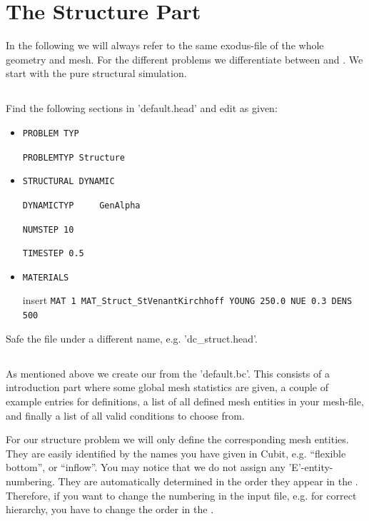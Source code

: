 \section{The Structure Part}

In the following we will always refer to the same exodus-file of the whole
geometry and mesh. For the different problems we differentiate between \head and
\bc. We start with the pure structural simulation.

\subsection{\head}
Find the following sections in 'default.head' and edit as given:

\begin{itemize}
 \item \verb|PROBLEM TYP|

 \verb|PROBLEMTYP Structure|
 \item \verb|STRUCTURAL DYNAMIC|

 \verb|DYNAMICTYP     GenAlpha|

 \verb|NUMSTEP 10|

 \verb|TIMESTEP 0.5|

 \item \verb|MATERIALS|

  insert \verb|MAT 1 MAT_Struct_StVenantKirchhoff YOUNG 250.0 NUE 0.3 DENS 500|
 
\end{itemize}
Safe the file under a different name, e.g. 'dc\_struct.head'.


\subsection{\bc}
As mentioned above we create our \bc from the 'default.bc'. This consists of a
introduction part where some global mesh statistics are given, a couple of
example entries for definitions, a list of all defined mesh entities in
your mesh-file, and finally a list of all valid \baci{} conditions to choose
from.

For our structure problem we will only define the corresponding mesh entities. They are easily identified by the names you have given in Cubit, e.g. ``flexible bottom'', or ``inflow''. You may notice that we do not assign any 'E'-entity-numbering.
They are automatically determined in the order they appear in the \bc. Therefore, if you want to change the numbering in the \baci{} input file, e.g. for correct hierarchy, you have to change the order in the \bc.

